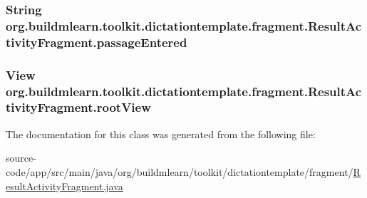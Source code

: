 \subsubsection[{\texorpdfstring{passage\+Entered}{passageEntered}}]{\setlength{\rightskip}{0pt plus 5cm}String org.\+buildmlearn.\+toolkit.\+dictationtemplate.\+fragment.\+Result\+Activity\+Fragment.\+passage\+Entered\hspace{0.3cm}{\ttfamily [private]}}\hypertarget{classorg_1_1buildmlearn_1_1toolkit_1_1dictationtemplate_1_1fragment_1_1ResultActivityFragment_afded822db2f8ac97a394751f6940ec97}{}\label{classorg_1_1buildmlearn_1_1toolkit_1_1dictationtemplate_1_1fragment_1_1ResultActivityFragment_afded822db2f8ac97a394751f6940ec97}
\subsubsection[{\texorpdfstring{root\+View}{rootView}}]{\setlength{\rightskip}{0pt plus 5cm}View org.\+buildmlearn.\+toolkit.\+dictationtemplate.\+fragment.\+Result\+Activity\+Fragment.\+root\+View\hspace{0.3cm}{\ttfamily [private]}}\hypertarget{classorg_1_1buildmlearn_1_1toolkit_1_1dictationtemplate_1_1fragment_1_1ResultActivityFragment_ae67ea10f7f911465063442c443424083}{}\label{classorg_1_1buildmlearn_1_1toolkit_1_1dictationtemplate_1_1fragment_1_1ResultActivityFragment_ae67ea10f7f911465063442c443424083}


The documentation for this class was generated from the following file\+:\begin{DoxyCompactItemize}
\item 
source-\/code/app/src/main/java/org/buildmlearn/toolkit/dictationtemplate/fragment/\hyperlink{ResultActivityFragment_8java}{Result\+Activity\+Fragment.\+java}\end{DoxyCompactItemize}
